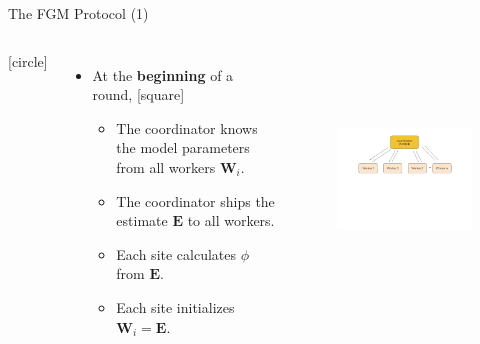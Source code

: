 \begin{frame}{The FGM Protocol (1)}
    \begin{columns}
        [circle]
        \begin{itemize}
            \item{At the \textbf{beginning} of a round,
            \vspace{0.2cm}
            [square]
            \begin{itemize}
                \item{The coordinator knows the model parameters from all workers $\pmb{W}_i$.}
                \vspace{0.3cm}
                \item{The coordinator ships the estimate $\pmb{E}$ to all workers.}
                \vspace{0.3cm}
                \item{Each site calculates $\phi$ from $\pmb{E}$.}
                \vspace{0.3cm}
                \item{Each site initializes $\pmb{W}_i=\pmb{E}$.}
            \end{itemize}
            }
        \end{itemize}
        \begin{figure}
            \includegraphics[width=8.5cm,height=6cm,center]{images/ml-fgm-2.png}\label{fig:ml-fgm-1}
        \end{figure}
    \end{columns}
\end{frame}

